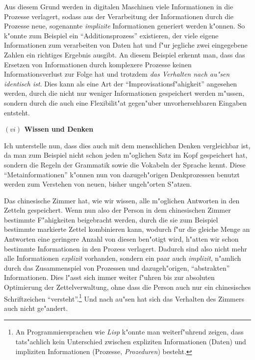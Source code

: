 \documentclass[a4paper, emulatestandardclasses, 12pt]{scrartcl}
\begin{document}
\begin{onehalfspace}
Aus diesem Grund werden in digitalen Maschinen viele Informationen in die Prozesse verlagert, sodass aus der Verarbeitung der Informationen durch die Prozesse neue, sogenannte \emph{implizite} Informationen generiert werden k"onnen. So k"onnte zum Beispiel ein "`Additionsprozess"' existieren, der viele eigene Informationen zum verarbeiten von Daten hat und f"ur jegliche zwei eingegebene Zahlen ein richtiges Ergebnis ausgibt. An diesem Beispiel erkennt man, dass das Ersetzen von Informationen durch komplexere Prozesse keinen Informationsverlust zur Folge hat und trotzdem \emph{das Verhalten nach au"sen identisch ist}. Dies kann als eine Art der "`Improvisationsf"ahigkeit"' angesehen werden, durch die nicht nur weniger Informationen gespeichert werden m"ussen, sondern durch die auch eine Flexibilit"at gegen"uber unvorhersehbaren Eingaben entsteht. 

\vspace{5mm}
\noindent\textbf{$(vi)$ Wissen und Denken}

\noindent Ich unterstelle nun, dass dies auch mit dem menschlichen Denken vergleichbar ist, da man zum Beispiel nicht schon jeden m"oglichen Satz im Kopf gespeichert hat, sondern die Regeln der Grammatik sowie die Vokabeln der Sprache kennt. Diese "`Metainformationen"' k"onnen nun von dazugeh"origen Denkprozessen benutzt werden zum Verstehen von neuen, bisher ungeh"orten S"atzen.

Das chinesische Zimmer hat, wie wir wissen, alle m"oglichen Antworten in den Zetteln gespeichert. Wenn nun also der Person in dem chinesischen Zimmer bestimmte F"ahigkeiten beigebracht werden, durch die sie zum Beispiel bestimmte markierte Zettel kombinieren kann, wodurch f"ur die gleiche Menge an Antworten eine geringere Anzahl von diesen ben"otigt wird, h"atten wir schon bestimmte Informationen in den Prozess verlagert. Dadurch sind also nicht mehr alle Informationen \emph{explizit} vorhanden, sondern ein paar auch \emph{implizit}, n"amlich durch das Zusammenspiel von Prozessen und dazugeh"origen, "`abstrakten"' Informationen. Dies l"asst sich immer weiter f"uhren bis zur absoluten Optimierung der Zettelverwaltung, ohne dass die Person auch nur ein chinesisches Schriftzeichen "`versteht"'.\footnote{An Programmiersprachen wie \emph{Lisp} k"onnte man weiterf"uhrend zeigen, dass tats"achlich kein Unterschied zwischen expliziten Informationen (Daten) und impliziten Informationen (Prozesse, \emph{Prozeduren}) besteht.} Und nach au"sen hat sich das Verhalten des Zimmers auch nicht ge"andert. 


\end{onehalfspace}
\end{document}
